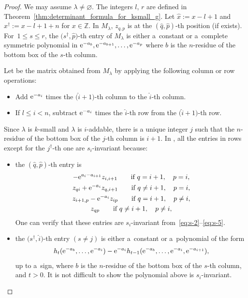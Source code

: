 \documentclass[10pt,a4paper]{amsart}
\numberwithin{equation}{section}
\newcommand{\la}{\lambda}
\def\ZZ{\mathord{\mathbb{Z}}}
\theoremstyle{definition}
\begin{document}
\begin{proof}
We may assume $\la\ne \varnothing$.
The integers $l$, $r$ are defined in Theorem~\ref{thm:determinant_formula_for_ksmall_g}.
Let $\hat{x}:=x-l+1$ and $x^\dagger:=x-l+1+n$ for $x\in \ZZ$.
In $M_\lambda$, $z_{q,p}$ is at the $(\hat{q},\hat{p})$-th position (if exists).
For~${1\le s\le r}$, the
$\bigl(s^\dagger,\hat{p}\bigr)$-th entry of $M_\lambda$ is either a~constant or a~complete symmetric polynomial in ${\rm e}^{-a_{b}},{\rm e}^{-a_{b+1}},\dots,{\rm e}^{-a_{p}}$ where $b$ is the $n$-residue of the bottom box of the $s$-th column.

Let  be the matrix obtained from $M_\lambda$ by applying the following column or row operations:
\begin{itemize}\itemsep=0pt
 \item[(a)] Add ${\rm e}^{-a_{i}}$ times the $\big(\hat{i}+1\big)$-th column to the $\hat{i}$-th column.
 \item[(b)] If $l\le i<n$, subtract ${\rm e}^{-a_{i}}$ times the $\hat{i}$-th row from the $\big(\hat{i}+1\big)$-th row.
\end{itemize}
Since $\lambda$ is $k$-small and $\la$ is $i$-addable, there is
a unique integer $j$ such that the $n$-residue of the bottom box of the $j$-th column is $i + 1$.
In , all the entries in rows except for the $j^\dagger$-th one are $s_{i}$-invariant because:
\begin{itemize}
\itemsep=0pt
 \item the $(\hat{q},\hat{p})$-th entry is
 \begin{gather*}
 -{\rm e}^{a_i-a_{i+1}}z_{i,i+1}\qquad \text{if} \ q=i+1,\quad p=i,\\
 z_{qi}+{\rm e}^{-a_i}z_{q,i+1}\qquad \text{if} \ q\neq i+1,\quad p=i,\\
 z_{i+1,p}-{\rm e}^{-a_i}z_{ip} \qquad \text{if} \ q=i+1,\quad p\neq i,\\
 z_{qp} \qquad \text{if} \ q\neq i+1,\quad p\neq i,
 \end{gather*}
One can verify that these entries are $s_i$-invariant from~\eqref{eq:s-2}--\eqref{eq:s-5}.
\item the $\bigl(s^\dagger,\hat{i}\bigr)$-th entry $(s\neq j)$ is either a~constant or a~polynomial of the form
\[
h_t({\rm e}^{-a_{b}},\dots,{\rm e}^{-a_i})-{\rm e}^{-a_i}h_{t-1}({\rm e}^{-a_{b}},\dots,{\rm e}^{-a_i},{\rm e}^{-a_{i+1}}),
\]
up to a~sign,
where $b$ is the $n$-residue of the bottom box of the $s$-th column, and $t>0$.
It is not difficult to show the polynomial above is
$s_i$-invariant.


\end{itemize}
\end{proof}
\end{document}
